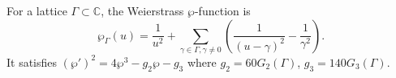 For a lattice $\Gamma \subset \mathbb{C}$, the Weierstrass $\wp$-function is
$$\wp_\Gamma(u) = \frac{1}{u^2} + \sum_{\gamma \in \Gamma, \gamma \neq 0} \left(\frac{1}{(u-\gamma)^2} - \frac{1}{\gamma^2}\right).$$
It satisfies $(\wp')^2 = 4\wp^3 - g_2 \wp - g_3$ where $g_2 = 60G_2(\Gamma)$, $g_3 = 140G_3(\Gamma)$.
